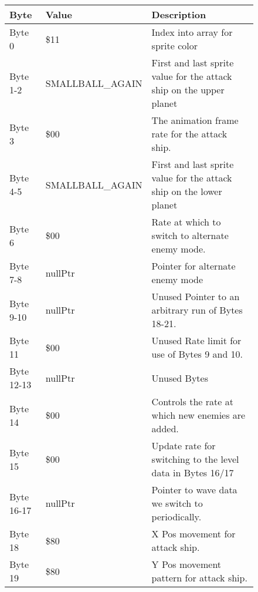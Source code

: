 \begin{figure}[H]
  {
  \setlength{\tabcolsep}{3.0pt}
  \setlength\cmidrulewidth{\heavyrulewidth} %
  \begin{adjustbox}{width=12cm}

\begin{tabular}{lll}
\toprule
 Byte       & Value                      & Description                                                         \\
\midrule
 Byte 0     & \$11                        & Index into array for sprite color                                   \\
 Byte 1-2   & SMALLBALL\_AGAIN            & First and last sprite value for the attack ship on the upper planet \\
 Byte 3     & \$00                        & The animation frame rate for the attack ship.                       \\
 Byte 4-5   & SMALLBALL\_AGAIN            & First and last sprite value for the attack ship on the lower planet \\
 Byte 6     & \$00                        & Rate at which to switch to alternate enemy mode.                    \\
 Byte 7-8   & nullPtr                    & Pointer for alternate enemy mode                                    \\
 Byte 9-10  & nullPtr                    & Unused Pointer to an arbitrary run of Bytes 18-21.                  \\
 Byte 11    & \$00                        & Unused Rate limit for use of Bytes 9 and 10.                        \\
 Byte 12-13 & nullPtr                    & Unused Bytes                                                        \\
 Byte 14    & \$00                        & Controls the rate at which new enemies are added.                   \\
 Byte 15    & \$00                        & Update rate for switching to the level data in Bytes 16/17          \\
 Byte 16-17 & nullPtr                    & Pointer to wave data we switch to periodically.                     \\
 Byte 18    & \$80                        & X Pos movement for attack ship.                                     \\
 Byte 19    & \$80                        & Y Pos movement pattern for attack ship.                             \\

\end{tabular}
\end{adjustbox}}
\end{figure}

